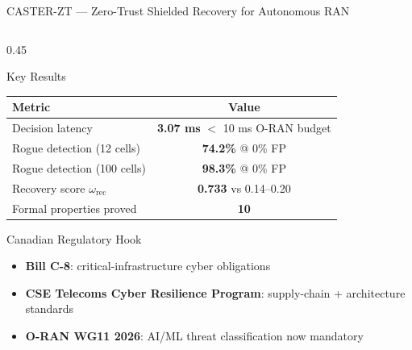 \documentclass[aspectratio=169, 11pt]{beamer}
\begin{document}
\begin{frame}{CASTER-ZT — Zero-Trust Shielded Recovery for Autonomous RAN}
\begin{columns}[T]
\begin{column}{0.45\textwidth}
  \begin{alertblock}{Key Results}
    \vspace{2pt}
    \begin{tabular}{lc}
      \toprule
      \textbf{Metric} & \textbf{Value}\\
      \midrule
      Decision latency & \textbf{3.07 ms} $<$ 10 ms O-RAN budget \\
      Rogue detection (12 cells) & \textbf{74.2\%} @ 0\% FP \\
      Rogue detection (100 cells) & \textbf{98.3\%} @ 0\% FP \\
      Recovery score $\omega_{\mathrm{rec}}$ & \textbf{0.733} vs 0.14–0.20 \\
      Formal properties proved & \textbf{10} \\
      \bottomrule
    \end{tabular}
    \vspace{2pt}
  \end{alertblock}

  \vspace{6pt}
  \begin{exampleblock}{Canadian Regulatory Hook}
    \vspace{2pt}
    \begin{itemize}\setlength{\itemsep}{2pt}
      \item[\textbullet] \textbf{Bill C-8}: critical-infrastructure cyber obligations
      \item[\textbullet] \textbf{CSE Telecoms Cyber Resilience Program}: supply-chain + architecture standards
      \item[\textbullet] \textbf{O-RAN WG11 2026}: AI/ML threat classification now mandatory
    \end{itemize}
    \vspace{2pt}
  \end{exampleblock}

\end{column}
\end{columns}

\vspace{2pt}

\end{frame}
\end{document}
